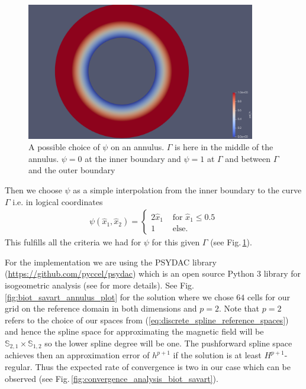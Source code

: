 \documentclass[../master_thesis.tex]{subfiles}
\begin{document}
\begin{figure}
    \centering
    \includegraphics[width=10cm]{plot_files/manufactured_inner_curve/psi_h.png}
    \caption{A possible choice of $\psi$ on an annulus. $\Gamma$ is here in the 
    middle of the annulus. $\psi = 0$ at the inner boundary and $\psi=1$ 
    at $\Gamma$ and between $\Gamma$ and the outer boundary}
    \label{fig:psi_annulus}
\end{figure}

Then we choose $\psi$ as a simple interpolation from the inner boundary to 
the curve $\Gamma$ i.e. in logical coordinates 
\begin{align}
    \psi(\hat{x}_1,\hat{x}_2) = \begin{cases}
        2 \hat{x}_1 & \text{ for $\hat{x}_1 \leq 0.5$} 
        \\ 1 & \text{ else}.
    \end{cases}\label{eq:linear_interpolation_psi}
\end{align}This fulfills all the criteria we had for $\psi$ for this given $\Gamma$ 
(see Fig.\,\ref{fig:psi_annulus}). 

For the implementation we are using the PSYDAC library (\url{https://github.com/pyccel/psydac}) 
which is an open source 
Python 3 library 
for isogeometric analysis (see \cite{psydac_paper} for more details).
See Fig.\,\ref{fig:biot_savart_annulus_plot} for the solution where 
we chose $64$ cells for our grid on the reference domain in both dimensions and $p=2$. Note 
that $p=2$ refers to the choice of our spaces from
(\ref{eq:discrete_spline_reference_spaces}) and hence the spline space for approximating 
the magnetic field will be $\mathbb{S}_{2,1} \times \mathbb{S}_{1,2}$ 
so the lower spline degree will be one. 
The pushforward spline space achieves then an approximation error 
of $h^{p+1}$ \cite[Ch.4, (4.48)]{splines_and_pdes} if the solution is at least 
$H^{p+1}$-regular.
Thus the expected rate of 
convergence is two in our case which can be observed 
(see Fig.\,\ref{fig:convergence_analysis_biot_savart}).
\end{document}
